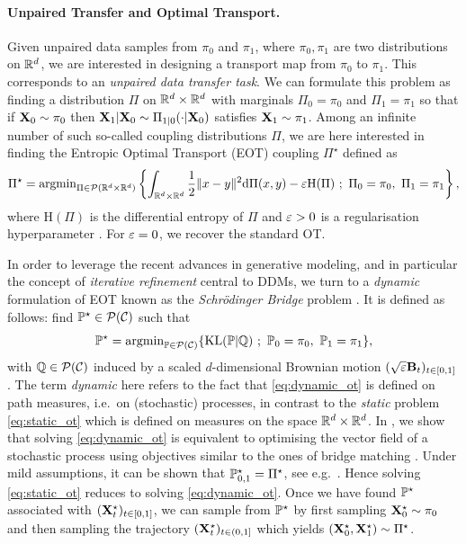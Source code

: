 \documentclass{article}
\begin{document}
\paragraph{Unpaired Transfer and Optimal Transport.} Given unpaired data samples from $\pi_0$ and $\pi_1$, where $\pi_0,\pi_1$ are two distributions on $\mathbb{R}^d$, we are interested in designing a transport map from $\pi_0$ to $\pi_1$. This corresponds to an \emph{unpaired data transfer task}.
We can formulate this problem as finding a distribution $\Pi$ on $\mathbb{R}^d\times \mathbb{R}^d$ with marginals $\Pi_0 = \pi_0$ and $\Pi_1 = \pi_1$ so that if $\mathbf{X}_0 \sim \pi_0$ then $\mathbf{X}_1|\mathbf{X}_0 \sim \Pi_{1|0}(\cdot|\mathbf{X}_0)$ satisfies $\mathbf{X}_1 \sim \pi_1$. Among an infinite number of such so-called coupling distributions $\Pi$, we are here interested in finding the Entropic Optimal Transport (EOT) coupling $\Pi^\star$ defined as
\begin{equation}
\label{eq:static_ot}
   \Pi^\star = \argmin_{\Pi \in \calP(\rset^d\times \rset^d)} \left\{ \int_{\rset^d \times \rset^d} \frac{1}{2} \| x - y \|^2 \rmd \Pi(x,y) - \varepsilon \mathrm{H}(\Pi) \ ; \ \Pi_0 = \pi_0, \ \Pi_1 = \pi_1 \right\} ,
\end{equation}
where 
$\mathrm{H}(\Pi)$ is the differential entropy of $\Pi$ and $\varepsilon > 0$ is a regularisation hyperparameter \citep{peyre2019computational}. For $\varepsilon= 0$, we recover the standard OT. 

In order to leverage the recent advances in generative modeling, and in particular the concept of \emph{iterative refinement} central to DDMs, we turn to a \emph{dynamic} formulation of EOT known as the \emph{Schr\"odinger Bridge} problem \citep{leonard2014survey}. It is defined as follows: find  $\mathbb{P}^\star \in \mathcal{P}(\mathcal{C})$ such that 
\begin{equation}
    \label{eq:dynamic_ot}
    \Pbb^\star = \argmin_{\Pbb \in \calP(\calC)} \{ \KL(\Pbb | \Qbb)  \ ; \ \Pbb_0 = \pi_0, \ \Pbb_1 = \pi_1 \} ,
\end{equation}
with $\mathbb{Q} \in \mathcal{P}(\mathcal{C})$ induced by a scaled $d$-dimensional Brownian motion $(\sqrt{\varepsilon} \mathbf{B}_t)_{t \in [0,1]}$. The term \emph{dynamic} here refers to the fact that \eqref{eq:dynamic_ot} is defined on path measures, i.e.~on (stochastic) processes, in contrast to the \emph{static} problem \eqref{eq:static_ot} which is defined on measures on the space $\mathbb{R}^d \times \mathbb{R}^d$. 
In , we show that solving \eqref{eq:dynamic_ot} is equivalent to optimising the vector field of a stochastic process using objectives similar to the ones of bridge matching \citep{peluchettinon,albergo_building_2023,lipman_flow_2022,liu2023I2SB}. Under mild assumptions, it can be shown that $\mathbb{P}^\star_{0,1} = \Pi^\star$, see e.g.~\citep{leonard2014survey,pavon2018data}. Hence solving \eqref{eq:static_ot} reduces to solving \eqref{eq:dynamic_ot}. Once we have found $\mathbb{P}^\star$ associated with $(\mathbf{X}_t^\star)_{t \in [0,1]}$, we can sample from $\mathbb{P}^\star$ by first sampling $\mathbf{X}_0^\star \sim \pi_0$ and then sampling the trajectory $(\mathbf{X}_t^\star)_{t \in (0,1]}$ which yields $(\mathbf{X}_0^\star, \mathbf{X}_1^\star)\sim \Pi^\star$.
\end{document}

